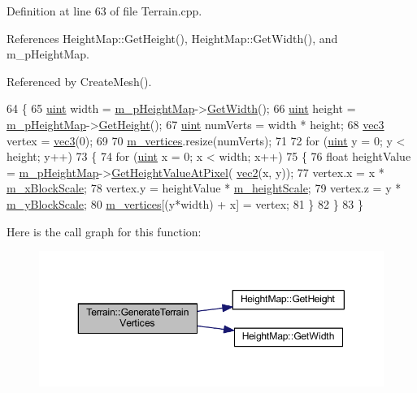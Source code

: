 Definition at line 63 of file Terrain.\+cpp.



References Height\+Map\+::\+Get\+Height(), Height\+Map\+::\+Get\+Width(), and m\+\_\+p\+Height\+Map.



Referenced by Create\+Mesh().


\begin{DoxyCode}
64 \{
65   \hyperlink{_types_8h_a4f5fce8c1ef282264f9214809524d836}{uint} width = \hyperlink{class_terrain_a1573c3a4a21afe306700bd00e7a9b4f5}{m\_pHeightMap}->\hyperlink{class_height_map_a85709e10bb08442730bfddb649a86e0b}{GetWidth}();
66   \hyperlink{_types_8h_a4f5fce8c1ef282264f9214809524d836}{uint} height = \hyperlink{class_terrain_a1573c3a4a21afe306700bd00e7a9b4f5}{m\_pHeightMap}->\hyperlink{class_height_map_a4c1243d24a8c5d039ea967a57a7bf462}{GetHeight}();
67   \hyperlink{_types_8h_a4f5fce8c1ef282264f9214809524d836}{uint} numVerts = width * height;
68   \hyperlink{_types_8h_a3d0ce73e3199de81565fb01632415288}{vec3} vertex = \hyperlink{_types_8h_a3d0ce73e3199de81565fb01632415288}{vec3}(0);
69 
70   \hyperlink{class_terrain_aae8e29e9fa34cddbac685e2ab286cf90}{m\_vertices}.resize(numVerts);
71 
72   \textcolor{keywordflow}{for} (\hyperlink{_types_8h_a4f5fce8c1ef282264f9214809524d836}{uint} y = 0; y < height; y++)
73   \{
74     \textcolor{keywordflow}{for} (\hyperlink{_types_8h_a4f5fce8c1ef282264f9214809524d836}{uint} x = 0; x < width; x++)
75     \{
76       \textcolor{keywordtype}{float} heightValue = \hyperlink{class_terrain_a1573c3a4a21afe306700bd00e7a9b4f5}{m\_pHeightMap}->\hyperlink{class_height_map_a895733b01397c21c3562e748267da822}{GetHeightValueAtPixel}(
      \hyperlink{_types_8h_a43182e59794291f6ab00e51b160706c2}{vec2}(x, y));
77       vertex.x = x * \hyperlink{class_terrain_aa0d137e5e0e7aaa3b348be32d4dc03ad}{m\_xBlockScale};
78       vertex.y = heightValue * \hyperlink{class_terrain_a63a6588e95aa892d8cd1d7236a7a3870}{m\_heightScale};
79       vertex.z = y * \hyperlink{class_terrain_a265cfbe55c45e80dade2f9dfe77d5055}{m\_yBlockScale};
80       \hyperlink{class_terrain_aae8e29e9fa34cddbac685e2ab286cf90}{m\_vertices}[(y*width) + x] = vertex;
81     \}
82   \}
83 \}
\end{DoxyCode}


Here is the call graph for this function\+:
\nopagebreak
\begin{figure}[H]
\begin{center}
\leavevmode
\includegraphics[width=350pt]{class_terrain_a7b82fc680b5747dadda8477bdcf33cf9_cgraph}
\end{center}
\end{figure}




